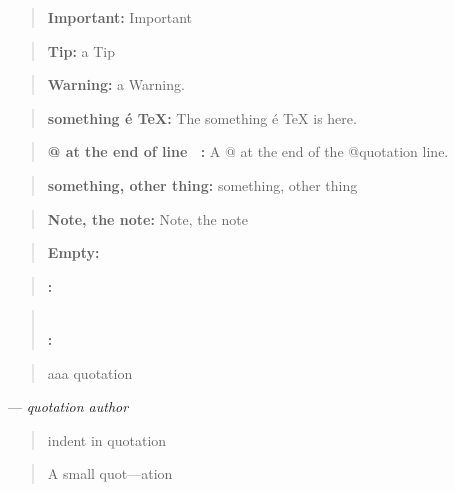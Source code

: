 \documentclass{book}
\begin{document}
\begin{titlepage}
\begin{quote}
\textbf{Important:} Important
\end{quote}

\begin{quote}
\textbf{Tip:} a Tip
\end{quote}

\begin{quote}
\textbf{Warning:} a Warning.
\end{quote}

\begin{quote}
\textbf{something \'{e} \TeX{}:} The something \'{e} \TeX{} is here.
\end{quote}

\begin{quote}
\textbf{@ at the end of line \ {}:} A @ at the end of the @quotation line.
\end{quote}

\begin{quote}
\textbf{something, other thing:} something, other thing
\end{quote}

\begin{quote}
\textbf{Note, the note:} Note, the note
\end{quote}

\begin{quote}
\end{quote}

\begin{quote}
\textbf{Empty:} \end{quote}

\begin{quote}
\textbf{:} \end{quote}

\begin{quote}
\textbf{\leavevmode{}\\:} \end{quote}

\begin{quote}
aaa quotation
\end{quote}
\begin{center}
--- \emph{quotation author}
\end{center}

\begin{quote}
indent in quotation
\end{quote}

\begin{quote}
\begin{footnotesize}
A small quot---ation
\end{footnotesize}
\end{quote}


\end{titlepage}
\end{document}
